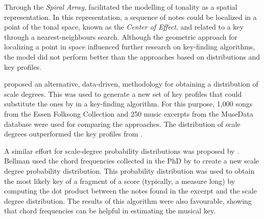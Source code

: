 
Through the \emph{Spiral Array}, \textcite{chew2002spiral}
facilitated the modelling of tonality as a spatial
representation. In this representation, a sequence of notes
could be localized in a point of the tonal space, known as
the \emph{Center of Effect}, and related to a key through a
nearest-neighbours search. Although the geometric approach
for localizing a point in space influenced further research
on key-finding algorithms, the model did not perform better
than the approaches based on distributions and key profiles.

\textcite{aarden2003dynamic} proposed an alternative,
data-driven, methodology for obtaining a distribution of
scale degrees. This was used to generate a new set of key
profiles that could substitute the ones by
\textcite{krumhansl1982tracing} in a key-finding algorithm.
For this purpose, 1,000 songs from the Essen Folksong
Collection and 250 music excerpts from the MuseData database
were used for comparing the approaches. The distribution of
scale degrees outperformed the key profiles from
\textcite{krumhansl1982tracing}.




A similar effort for scale-degree probability distributions
was proposed by \textcite{bellmann2006about}. Bellman used
the chord frequencies collected in the PhD \thesisdiss{} by
\textcite{budge1943study} to create a new scale degree
probability distribution. This probability distribution was
used to obtain the most likely key of a fragment of a score
(typically, a measure long) by computing the dot product
between the notes found in the excerpt and the scale degree
distribution. The results of this algorithm were also
favourable, showing that chord frequencies can be helpful in
estimating the musical key.

